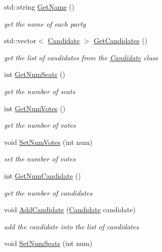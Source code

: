 \begin{DoxyCompactItemize}
std\+::string \hyperlink{classParty_aa93fa62109fbd645de2aa75f0fce2d42}{Get\+Name} ()
\begin{DoxyCompactList}\small\item\em get the name of each party \end{DoxyCompactList}\item 
std\+::vector$<$ \hyperlink{classCandidate}{Candidate} $>$ \hyperlink{classParty_a44a8a31088ed290f2cc59d6a42e81c07}{Get\+Candidates} ()
\begin{DoxyCompactList}\small\item\em get the list of candidates from the \hyperlink{classCandidate}{Candidate} class \end{DoxyCompactList}\item 
int \hyperlink{classParty_aa466a6724520d9e325c7d3e9e4aaeec1}{Get\+Num\+Seats} ()
\begin{DoxyCompactList}\small\item\em get the number of seats \end{DoxyCompactList}\item 
int \hyperlink{classParty_ad9d2f38fc5cb90f37c5e185c57346fde}{Get\+Num\+Votes} ()
\begin{DoxyCompactList}\small\item\em get the number of votes \end{DoxyCompactList}\item 
void \hyperlink{classParty_a60b1e5933f9f61cd8b9bd21b2c66f633}{Set\+Num\+Votes} (int num)
\begin{DoxyCompactList}\small\item\em set the number of votes \end{DoxyCompactList}\item 
int \hyperlink{classParty_a045386f85422520b6ef1f85cdba74dac}{Get\+Num\+Candidate} ()
\begin{DoxyCompactList}\small\item\em get the number of candidates \end{DoxyCompactList}\item 
void \hyperlink{classParty_a0ffe28b5f64b300dbe0d66356d8c6b1c}{Add\+Candidate} (\hyperlink{classCandidate}{Candidate} candidate)
\begin{DoxyCompactList}\small\item\em add the candidate into the list of candidates \end{DoxyCompactList}\item 
void \hyperlink{classParty_ae7523a0a047e5a6ffac376331ea11ded}{Set\+Num\+Seats} (int num)

\end{DoxyCompactItemize}
